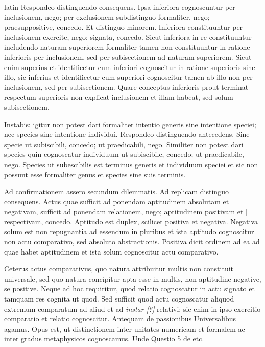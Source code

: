 \begin{otherlanguage*}{latin}
\pstart
 Respondeo distinguendo consequens. Ipsa inferiora cognoscuntur per inclusionem, nego; per exclusionem subdistinguo formaliter, nego; praesuppositive, concedo. Et distinguo minorem. Inferiora constituuntur per inclusionem exercite, nego; signata, concedo. Sicut inferiora in re constituuntur includendo naturam superiorem formaliter tamen non constituuntur in ratione inferioris per inclusionem, sed per subisectionem ad naturam superiorem. Sicut enim superius et identificetur cum inferiori cognoscitur in ratione superioris sine illo, sic inferius et identificetur cum superiori cognoscitur tamen ab illo non per inclusionem, sed per subisectionem. Quare conceptus inferioris prout terminat respectum superioris non explicat inclusionem et illam habeat, sed solum subisectionem. 
\pend

\pstart
 Instabis: igitur non potest dari formaliter intentio generis sine intentione speciei; nec species sine intentione individui. Respondeo distinguendo antecedens. Sine specie ut subiscibili, concedo; ut praedicabili, nego. Similiter non potest dari species quin cognoscatur individuum ut subiscibile, concedo; ut praedicabile, nego. Species ut subescibilis est terminus generis et individuum speciei et sic non possunt esse formaliter genus et species sine suis terminis. 
\pend

\pstart
 Ad confirmationem assero secundum dilemmatis. Ad replicam distinguo consequens. Actus quae sufficit ad ponendam aptitudinem absolutam et negativam, sufficit ad ponendam relationem, nego; aptitudinem positivam et \textnormal{|} respectivam, concedo. Aptitudo est duplex, scilicet positiva et negativa. Negativa solum est non repugnantia ad essendum in pluribus et ista aptitudo cognoscitur non actu comparativo, sed absoluto abstractionis. Positiva dicit ordinem ad ea ad quae habet aptitudinem et ista solum cognoscitur actu comparativo. 
\pend

\pstart
 Ceterus actus comparativus, quo natura attribuitur multis non constituit universale, sed quo natura concipitur apta esse in multis, non aptitudine negative, se positive. Neque ad hoc requiritur, quod relatio cognoscatur in actu signato et tamquam res cognita ut quod. Sed sufficit quod actu cognoscatur aliquod extremum comparatum ad aliud et ad \emph{instar [?]} relativi; sic enim in ipso exercitio comparatio et relatio cognoscitur. Antequam de passionibus Universalibus agamus. Opus est, ut distinctionem inter unitates numericam et formalem ac inter gradus metaphysicos cognoscamus. Unde Questio 5 de etc. 
\pend


\end{otherlanguage*}
